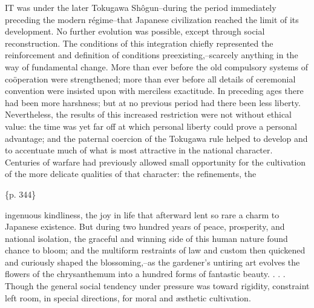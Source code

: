 IT was under the later Tokugawa Shôgun--during the period immediately preceding the modern régime--that Japanese civilization reached the limit of its development. No further evolution was possible, except through social reconstruction. The conditions of this integration chiefly represented the reinforcement and definition of conditions preexisting,--scarcely anything in the way of fundamental change. More than ever before the old compulsory systems of coöperation were strengthened; more than ever before all details of ceremonial convention were insisted upon with merciless exactitude. In preceding ages there had been more harshness; but at no previous period had there been less liberty. Nevertheless, the results of this increased restriction were not without ethical value: the time was yet far off at which personal liberty could prove a personal advantage; and the paternal coercion of the Tokugawa rule helped to develop and to accentuate much of what is most attractive in the national character. Centuries of warfare had previously allowed small opportunity for the cultivation of the more delicate qualities of that character: the refinements, the

\{p. 344\}

ingenuous kindliness, the joy in life that afterward lent so rare a charm to Japanese existence. But during two hundred years of peace, prosperity, and national isolation, the graceful and winning side of this human nature found chance to bloom; and the multiform restraints of law and custom then quickened and curiously shaped the blossoming,--as the gardener's untiring art evolves the flowers of the chrysanthemum into a hundred forms of fantastic beauty. . . . Though the general social tendency under pressure was toward rigidity, constraint left room, in special directions, for moral and æsthetic cultivation.

